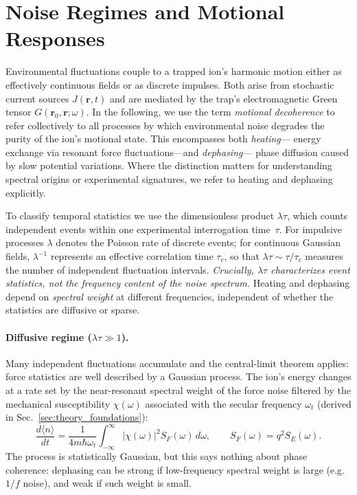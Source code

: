 \section{Noise Regimes and Motional Responses}
\label{sec:noise_regimes}

Environmental fluctuations couple to a trapped ion’s harmonic motion either
as effectively continuous fields or as discrete impulses.  Both arise from
stochastic current sources $J(\mathbf r,t)$ and are mediated by the trap’s
electromagnetic Green tensor $G(\mathbf r_0,\mathbf r;\omega)$.
In the following, we use the term \emph{motional decoherence} to refer
collectively to all processes by which environmental noise degrades the
purity of the ion’s motional state. This encompasses both \emph{heating}—
energy exchange via resonant force fluctuations—and \emph{dephasing}—
phase diffusion caused by slow potential variations. Where the distinction
matters for understanding spectral origins or experimental signatures,
we refer to heating and dephasing explicitly.

To classify temporal statistics we use the dimensionless product
$\lambda\tau$, which counts independent events within one experimental
interrogation time~$\tau$.  For impulsive processes $\lambda$ denotes the
Poisson rate of discrete events; for continuous Gaussian fields,
$\lambda^{-1}$ represents an effective correlation time $\tau_c$, so that
$\lambda\tau\!\sim\!\tau/\tau_c$ measures the number of independent
fluctuation intervals.  \emph{Crucially, $\lambda\tau$ characterizes event
statistics, not the frequency content of the noise spectrum.}
Heating and dephasing depend on \emph{spectral weight} at different
frequencies, independent of whether the statistics are diffusive or sparse.

\paragraph{Diffusive regime ($\lambda\tau\!\gg\!1$).}
Many independent fluctuations accumulate and the central-limit theorem
applies: force statistics are well described by a Gaussian process.
The ion’s energy changes at a rate set by the near-resonant spectral weight
of the force noise filtered by the mechanical susceptibility
$\chi(\omega)$ associated with the secular frequency $\omega_t$
(derived in Sec.~\ref{sec:theory_foundations}):
\[
\frac{d\langle n\rangle}{dt}
 = \frac{1}{4 m \hbar \omega_t}\!\int_{-\infty}^{\infty}\!
   |\chi(\omega)|^{2} S_F(\omega)\,d\omega,
\qquad S_F(\omega)=q^{2}S_E(\omega).
\]
The process is statistically Gaussian, but this says nothing about phase
coherence: dephasing can be strong if low-frequency spectral weight is large
(e.g.\ $1/f$ noise), and weak if such weight is small.

